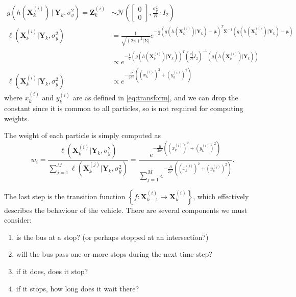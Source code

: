 \documentclass[14paper,twoside]{article}
\newcommand{\bX}{\mathbf{X}}
\newcommand{\bY}{\mathbf{Y}}
\newcommand{\bZ}{\mathbf{Z}}
\newcommand{\g}[1]{g\left(#1\right)}
\newcommand{\lhood}[1]{\ell\left(#1\right)}
\begin{document}
\begin{align}
  \label{eq:particle_likelihood}
  \g{h(\bX_k^{(i)}) \,|\, \bY_k, \sigma^2_y} = \bZ_k^{(i)} 
  &\sim  \mathcal{N}\left(
    \begin{bmatrix}
      0 \\ 0
    \end{bmatrix},
    \frac{\sigma_y^2}{R}\cdot I_2
  \right) \\
  \lhood{\bX_k^{(i)}| \bY_k, \sigma^2_y} 
  &= \frac{1}{\sqrt{\left(2\pi\right)^2 \left| \boldsymbol{\Sigma} \right|}}
    e^{-\frac{1}{2}\left(g(h(\bX_k^{(i)})|\bY_k) - \boldsymbol{\mu}\right)^T\boldsymbol\Sigma^{-1}\left(g(h(\bX_k^{(i)})|\bY_k) - 
    \boldsymbol{\mu}\right)} \nonumber \\
  &\propto
    e^{-\frac{1}{2}  \left(g(h(\bX_k^{(i)})|\bY_k)\right)^T \left(\frac{\sigma^2_y}{R} I_2 \right)^{-1} \left(g(h(\bX_k^{(i)})|\bY_k)\right) } \nonumber \\
  \label{eq:particle_likelihood_final}
  \lhood{\bX_k^{(i)}| \bY_k, \sigma^2_y} 
  &\propto e^{-\frac{R}{2\sigma^2}\left((x_k^{(i)})^2 + (y_k^{(i)})^2\right)}
\end{align}
where $x_k^{(i)}$ and $y_k^{(i)}$ are as defined in \cref{eq:transform},
and we can drop the constant since it is common to all particles,
so is not required for computing weights.

The weight of each particle is simply computed as
\begin{equation}
  \label{eq:particle_weights}
  w_i = \frac{\lhood{\bX_k^{(i)} | \bY_k, \sigma^2_y}}{\sum_{j=1}^M \lhood{\bX_k^{(j)} | \bY_k, \sigma^2_y}}
  = \frac{e^{-\frac{R}{2\sigma^2}\left((x_k^{(i)})^2 + (y_k^{(i)})^2\right)}}{\sum_{j=1}^M e^{-\frac{R}{2\sigma^2}\left((x_k^{(j)})^2 + (y_k^{(j)})^2\right)}}.
\end{equation}


The last step is the transition function $\left\{ f : \bX_{k-1}^{(i)} \mapsto \bX_k^{(i)} \right \}$,
which effectively describes the behaviour of the vehicle.
There are several components we must consider:
\begin{enumerate}
\item is the bus at a stop? (or perhaps stopped at an intersection?)
\item will the bus pass one or more stops during the next time step?
\item if it does, does it stop?
\item if it stops, how long does it wait there?
\end{enumerate}
\end{document}
